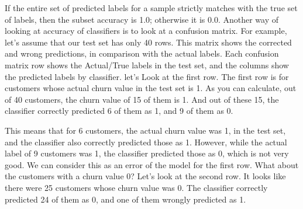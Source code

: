 	If the entire set of predicted labels for a sample strictly matches with the true set of labels, then the subset accuracy is 1.0; otherwise it is 0.0. Another way of looking at accuracy of classifiers is to look at a confusion matrix. For example, let’s assume that our test set has only 40 rows. This matrix shows the corrected and wrong predictions, in comparison with the actual labels. Each confusion matrix row shows the Actual/True labels in the test set, and the columns show the predicted labels by classifier. let's Look at the first row. The first row is for customers whose actual churn value in the test set is 1. As you can calculate, out of 40 customers, the churn value of 15 of them is 1. And out of these 15, the classifier correctly predicted 6 of them as 1, and 9 of them as 0.
	
	This means that for 6 customers, the actual churn value was 1, in the test set, and the classifier also correctly predicted those as 1. However, while the actual label of 9 customers was 1, the classifier predicted those as 0, which is not very good. We can consider this as an error of the model for the first row. What about the customers with a churn value 0? Let’s look at the second row. It looks like there were 25 customers whose churn value was 0. The classifier correctly predicted 24 of them as 0, and one of them wrongly predicted as 1.
	
